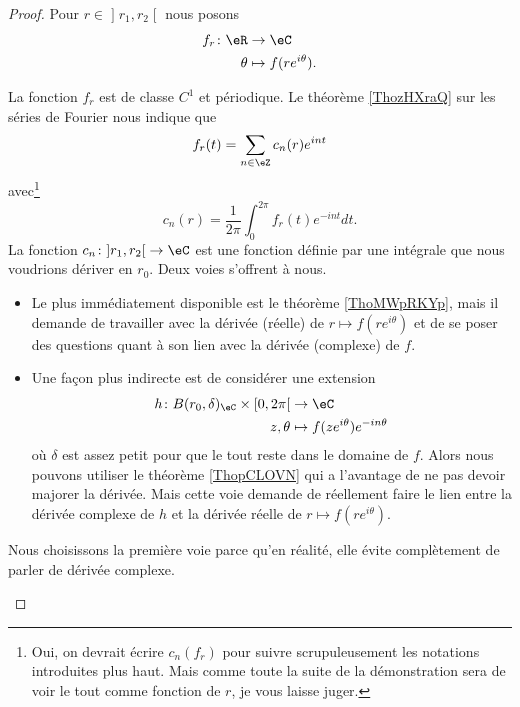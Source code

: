 \begin{proof}
	Pour \( r\in\mathopen] r_1 , r_2 \mathclose[\) nous posons
	\begin{equation}
		\begin{aligned}
			f_r\colon \eR & \to \eC                   \\
			\theta        & \mapsto f(r e^{i\theta}).
		\end{aligned}
	\end{equation}
	\begin{subproof}
		La fonction \( f_r\) est de classe \( C^1\) et périodique. Le théorème \ref{ThozHXraQ} sur les séries de Fourier nous indique que
		\begin{equation}      \label{EQooIHQRooZWqJKL}
			f_r(t)=\sum_{n\in \eZ}c_n(r) e^{int}
		\end{equation}
		avec\footnote{Oui, on devrait écrire \( c_n(f_r)\) pour suivre scrupuleusement les notations introduites plus haut. Mais comme toute la suite de la démonstration sera de voir le tout comme fonction de \( r\), je vous laisse juger.}
		\begin{equation}
			c_n(r)=\frac{1}{ 2\pi }\int_0^{2\pi}f_r(t) e^{-int}dt.
		\end{equation}
		La fonction \( c_n\colon \mathopen] r_1 , r_2 \mathclose[\to \eC\) est une fonction définie par une intégrale que nous voudrions dériver en \( r_0\).
			\spitem[Digression]
			Deux voies s'offrent à nous.
			\begin{itemize}
				\item Le plus immédiatement disponible est le théorème \ref{ThoMWpRKYp}, mais il demande de travailler avec la dérivée (réelle) de \( r\mapsto f(r e^{i\theta})\) et de se poser des questions quant à son lien avec la dérivée (complexe) de \( f\).
				\item Une façon plus indirecte est de considérer une extension
				      \begin{equation}
					      \begin{aligned}
						      h\colon B(r_0,\delta)_{\eC}\times \mathopen[ 0 , 2\pi \mathclose[ & \to \eC                                \\
						      z,\theta                                                          & \mapsto f(z e^{i\theta}) e^{-in\theta}
					      \end{aligned}
				      \end{equation}
				      où \( \delta\) est assez petit pour que le tout reste dans le domaine de \( f\). Alors nous pouvons utiliser le théorème \ref{ThopCLOVN} qui a l'avantage de ne pas devoir majorer la dérivée. Mais cette voie demande de réellement faire le lien entre la dérivée complexe de \( h\) et la dérivée réelle de \( r\mapsto f(r e^{i\theta})\).
			\end{itemize}
			Nous choisissons la première voie parce qu'en réalité, elle évite complètement de parler de dérivée complexe.


\end{subproof}
\end{proof}
